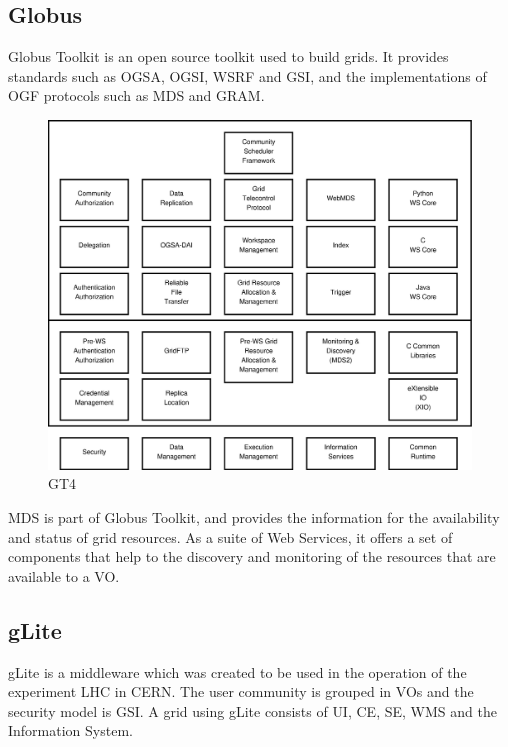 \subsection{Globus}

Globus Toolkit is an open source toolkit used to build grids. It provides standards such as \ac{OGSA}, \ac{OGSI}, \ac{WSRF} and \ac{GSI}, and the implementations of \ac{OGF} protocols such as \ac{MDS} and \ac{GRAM}.

\begin{figure}[htb]
\centering
 \includegraphics[width=130mm]{images/globus.eps}
\caption{\ac{GT4}}
\label{figure:globus}
\end{figure}

\ac{MDS} is part of Globus Toolkit, and provides the information for the availability and status of grid resources. As a suite of Web Services, it offers a set of components that help to the discovery and monitoring of the resources that are available to a \ac{VO}.

\subsection{gLite}

gLite is a middleware which was created to be used in the operation of the experiment \ac{LHC} in CERN. The user community is grouped in \acp{VO} and the security model is \ac{GSI}. A grid using gLite consists of \ac{UI}, \ac{CE}, \ac{SE}, \ac{WMS} and the Information System.

